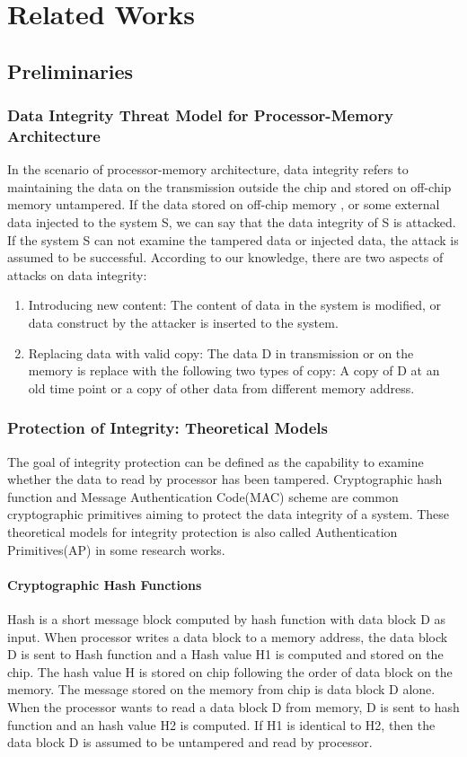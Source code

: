 \documentclass{article}
\begin{document}
\section{Related Works} 
\subsection{Preliminaries}
\subsubsection{Data Integrity Threat Model for Processor-Memory Architecture}
In the scenario of processor-memory architecture, data integrity refers to maintaining the data on the transmission outside the chip and stored on off-chip memory untampered. If the data stored on off-chip memory , or some external data injected to the system S, we can say that the data integrity of S is attacked. If the system S can not examine the tampered data or injected data, the attack is assumed to be successful. According to our knowledge, there are two aspects of attacks on data integrity:
\begin{enumerate}
	\item Introducing new content: The content of data in the system is modified, or data construct by the attacker is inserted to the system.
	\item Replacing data with valid copy: The data D in transmission or on the memory is replace with the following two types of copy: A copy of D at an old time point or a copy of other data from different memory address.
\end{enumerate}

\subsubsection{Protection of Integrity: Theoretical Models}
The goal of integrity protection can be defined as the capability to examine whether the data to read by processor has been tampered. Cryptographic hash function and Message Authentication Code(MAC) scheme are common cryptographic primitives aiming to protect the data integrity of a system. These theoretical models for integrity protection is also called Authentication Primitives(AP) in some research works.

\paragraph{Cryptographic Hash Functions}
Hash is a short message block computed by hash function with data block D as input.
When processor writes a data block to a memory address, the data block D is sent to Hash function and a Hash value H1 is computed and stored on the chip. The hash value H is stored on chip following the order of data block on the memory. The message stored on the memory from chip is data block D alone.
When the processor wants to read a data block D from memory, D is sent to hash function and an hash value H2 is computed. If H1 is identical to H2, then the data block D is assumed to be untampered and read by processor.
\end{document}
